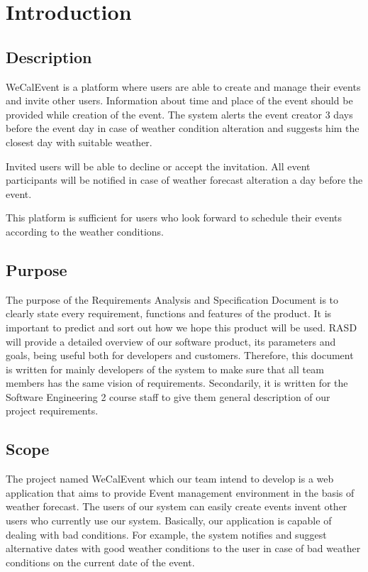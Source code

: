 \newpage
\section{Introduction}


\subsection{Description}
\quad WeCalEvent is a platform where users are able to create and manage their events and invite other users. Information about time and place of the event should be provided while creation of the event. The system alerts the event creator 3 days before the event day in case of weather condition alteration and suggests him the closest day with suitable weather.
\par Invited users will be able to decline or accept the invitation. All event participants will be notified in case of weather forecast alteration a day before the event.
\par This platform is sufficient for users who look forward to schedule their events according to the weather conditions.

\subsection{Purpose}
\quad The purpose of the Requirements Analysis and Specification Document is to clearly state every requirement, functions and features of the product. It is important to predict and sort out how we hope this product will be used. RASD will provide a detailed overview of our software product, its parameters and goals, being useful both for developers and customers. Therefore, this document is written for mainly developers of the system to make sure that all team members has the same vision of requirements. Secondarily, it is written for the Software Engineering 2 course staff to give them general description of our project requirements.

\subsection{Scope}
\quad The project named WeCalEvent which our team intend to develop is a web application that aims to provide Event management environment in the basis of weather forecast. The users of our system can easily create events invent other users who currently use our system. Basically, our application is capable of dealing with bad conditions. For example, the system notifies and suggest alternative dates with good weather conditions to the user in case of bad weather conditions on the current date of the event.
